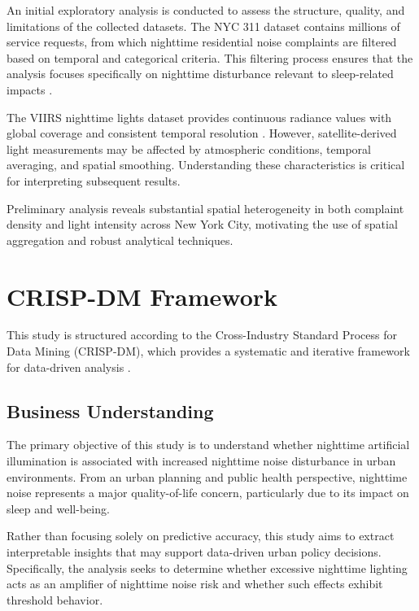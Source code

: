 \documentclass[conference]{IEEEtran}
\begin{document}
An initial exploratory analysis is conducted to assess the structure, quality,
and limitations of the collected datasets.
The NYC 311 dataset contains millions of service requests, from which nighttime
residential noise complaints are filtered based on temporal and categorical criteria.
This filtering process ensures that the analysis focuses specifically on nighttime
disturbance relevant to sleep-related impacts \cite{basner2014auditory}.

The VIIRS nighttime lights dataset provides continuous radiance values with global
coverage and consistent temporal resolution \cite{elvidge2017viirs}.
However, satellite-derived light measurements may be affected by atmospheric conditions,
temporal averaging, and spatial smoothing.
Understanding these characteristics is critical for interpreting subsequent results.

Preliminary analysis reveals substantial spatial heterogeneity in both complaint density
and light intensity across New York City, motivating the use of spatial aggregation
and robust analytical techniques.

\section{CRISP-DM Framework}

This study is structured according to the Cross-Industry Standard Process for Data Mining
(CRISP-DM), which provides a systematic and iterative framework for data-driven analysis
\cite{shearer2000crispdm}.

\subsection{Business Understanding}

The primary objective of this study is to understand whether nighttime artificial
illumination is associated with increased nighttime noise disturbance in urban environments.
From an urban planning and public health perspective, nighttime noise represents a major
quality-of-life concern, particularly due to its impact on sleep and well-being.

Rather than focusing solely on predictive accuracy, this study aims to extract
interpretable insights that may support data-driven urban policy decisions.
Specifically, the analysis seeks to determine whether excessive nighttime lighting acts
as an amplifier of nighttime noise risk and whether such effects exhibit threshold behavior.
\end{document}
